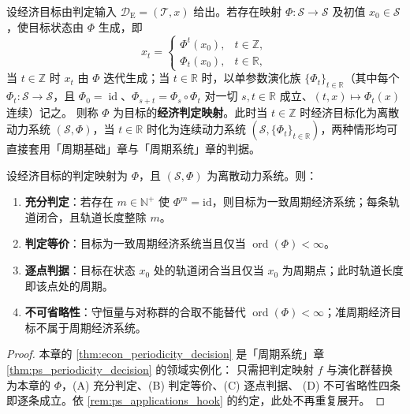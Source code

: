 \begin{definition}[经济判定映射]\label{def:econ_periodization}
设经济目标由判定输入 $\mathcal D_{\mathrm{E}}=(\mathcal T,x)$ 给出。若存在映射 $\Phi:\mathcal S\to\mathcal S$ 及初值 $x_0\in\mathcal S$，使目标状态由 $\Phi$ 生成，即
\[
x_t=\begin{cases}\Phi^t(x_0), & t\in\mathbb Z,\\ \Phi_t(x_0), & t\in\mathbb R,\end{cases}
\]
当 $t\in\mathbb Z$ 时 $x_t$ 由 $\Phi$ 迭代生成；当 $t\in\mathbb R$ 时，以单参数演化族 $\{\Phi_t\}_{t\in\mathbb R}$（其中每个 $\Phi_t:\mathcal S\to\mathcal S$，且 $\Phi_0=\operatorname{id}$、$\Phi_{s+t}=\Phi_s\circ\Phi_t$ 对一切 $s,t\in\mathbb R$ 成立、$(t,x)\mapsto\Phi_t(x)$ 连续）记之。
则称 $\Phi$ 为目标的\textbf{经济判定映射}。此时当 $t\in\mathbb Z$ 时经济目标化为离散动力系统 $(\mathcal S,\Phi)$，当 $t\in\mathbb R$ 时化为连续动力系统 $(\mathcal S,\{\Phi_t\}_{t\in\mathbb R})$，两种情形均可直接套用「周期基础」章与「周期系统」章的判据。
\end{definition}

\begin{theorem}[经济周期性判定定理]\label{thm:econ_periodicity_decision}
设经济目标的判定映射为 $\Phi$，且 $(\mathcal S,\Phi)$ 为离散动力系统。则：
\begin{enumerate}[label=(\Alph*)]
    \item \textbf{充分判定}：若存在 $m\in\mathbb N^+$ 使 $\Phi^m=\mathrm{id}$，则目标为一致周期经济系统；每条轨道闭合，且轨道长度整除 $m$。
    \item \textbf{判定等价}：目标为一致周期经济系统当且仅当 $\operatorname{ord}(\Phi)<\infty$。
    \item \textbf{逐点判据}：目标在状态 $x_0$ 处的轨道闭合当且仅当 $x_0$ 为周期点；此时轨道长度即该点处的周期。
    \item \textbf{不可省略性}：守恒量与对称群的合取不能替代 $\operatorname{ord}(\Phi)<\infty$；准周期经济目标不属于周期经济系统。
\end{enumerate}
\end{theorem}

\begin{proof}
本章的 \cref{thm:econ_periodicity_decision} 是「周期系统」章 \cref{thm:ps_periodicity_decision} 的领域实例化：
只需把判定映射 $f$ 与演化群替换为本章的 $\Phi$，(A) 充分判定、(B) 判定等价、(C) 逐点判据、
(D) 不可省略性四条即逐条成立。依 \cref{rem:ps_applications_hook} 的约定，此处不再重复展开。
\end{proof}

